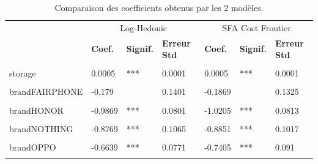 \documentclass[
  12pt,
]{report}
\begin{document}
\begin{table}[!h]

\caption{\label{tab:loghedonic_sfa_comp}Comparaison des coefficients obtenus par les 2 modèles.}
\centering
\begin{tabular}[t]{lllllll}
\toprule
\multicolumn{1}{c}{ } & \multicolumn{3}{c}{Log-Hedonic} & \multicolumn{3}{c}{SFA Cost Frontier} \\
\cmidrule(l{3pt}r{3pt}){2-4} \cmidrule(l{3pt}r{3pt}){5-7}
\textbf{ } & \textbf{Coef.} & \textbf{Signif.} & \textbf{Erreur Std} & \textbf{Coef.} & \textbf{Signif.} & \textbf{Erreur Std}\\
\midrule
\cellcolor{gray!6}{(Intercept)} & \cellcolor{gray!6}{4.3197} & \cellcolor{gray!6}{***} & \cellcolor{gray!6}{0.2526} & \cellcolor{gray!6}{4.0863} & \cellcolor{gray!6}{***} & \cellcolor{gray!6}{0.2543}\\
storage & 0.0005 & *** & 0.0001 & 0.0005 & *** & 0.0001\\
\cellcolor{gray!6}{brandASUS} & \cellcolor{gray!6}{-0.357} & \cellcolor{gray!6}{**} & \cellcolor{gray!6}{0.1091} & \cellcolor{gray!6}{-0.3849} & \cellcolor{gray!6}{***} & \cellcolor{gray!6}{0.1092}\\
brandFAIRPHONE & -0.179 &  & 0.1401 & -0.1869 &  & 0.1325\\
\cellcolor{gray!6}{brandGOOGLE} & \cellcolor{gray!6}{-0.4298} & \cellcolor{gray!6}{***} & \cellcolor{gray!6}{0.0897} & \cellcolor{gray!6}{-0.5019} & \cellcolor{gray!6}{***} & \cellcolor{gray!6}{0.099}\\
\addlinespace
brandHONOR & -0.9869 & *** & 0.0801 & -1.0205 & *** & 0.0813\\
\cellcolor{gray!6}{brandMOTOROLA} & \cellcolor{gray!6}{-0.7181} & \cellcolor{gray!6}{***} & \cellcolor{gray!6}{0.0732} & \cellcolor{gray!6}{-0.7885} & \cellcolor{gray!6}{***} & \cellcolor{gray!6}{0.0863}\\
brandNOTHING & -0.8769 & *** & 0.1065 & -0.8851 & *** & 0.1017\\
\cellcolor{gray!6}{brandONEPLUS} & \cellcolor{gray!6}{-0.6518} & \cellcolor{gray!6}{***} & \cellcolor{gray!6}{0.1065} & \cellcolor{gray!6}{-0.6815} & \cellcolor{gray!6}{***} & \cellcolor{gray!6}{0.1044}\\
brandOPPO & -0.6639 & *** & 0.0771 & -0.7405 & *** & 0.091\\
\addlinespace
\cellcolor{gray!6}{brandREALME} & \cellcolor{gray!6}{-0.6436} & \cellcolor{gray!6}{***} & \cellcolor{gray!6}{0.0795} & \cellcolor{gray!6}{-0.6727} & \cellcolor{gray!6}{***} & \cellcolor{gray!6}{0.0798}\\

\end{tabular}
\end{table}
\end{document}
